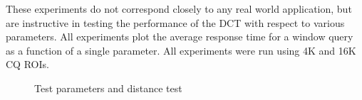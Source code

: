 \documentclass{ucdthesis}       %
\begin{document}
These experiments do not correspond closely to any real world
application, but are instructive in testing the performance of the
\ac{DCT} with respect to various parameters.  All experiments plot the
average response time for a window query as a function of a single
parameter.  All experiments were run using 4K and 16K \ac{CQ} \acp{ROI}.
%
\begin{figure}[htb]
  \caption{Test parameters and distance test}
\end{figure}
\end{document}
